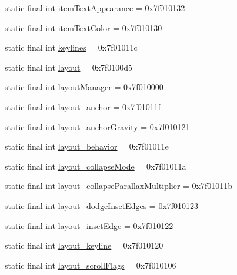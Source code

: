\begin{CompactItemize}
\item 
static final int \hyperlink{classandroid_1_1support_1_1transition_1_1_r_1_1attr_502aeef98fd65a8774129bb15aebb722}{itemTextAppearance} = 0x7f010132
\item 
static final int \hyperlink{classandroid_1_1support_1_1transition_1_1_r_1_1attr_2be6a5b1db7aac1be85b61a0a81d6a21}{itemTextColor} = 0x7f010130
\item 
static final int \hyperlink{classandroid_1_1support_1_1transition_1_1_r_1_1attr_3b26d81a9d1e46f3df549134e8cafca7}{keylines} = 0x7f01011c
\item 
static final int \hyperlink{classandroid_1_1support_1_1transition_1_1_r_1_1attr_5b38b08230f0458ed53a4c21a3efcdec}{layout} = 0x7f0100d5
\item 
static final int \hyperlink{classandroid_1_1support_1_1transition_1_1_r_1_1attr_d87d38e1dce19d5b501e04e8121d3af8}{layoutManager} = 0x7f010000
\item 
static final int \hyperlink{classandroid_1_1support_1_1transition_1_1_r_1_1attr_9c3a6b35debd5592af5a68d2a1174a74}{layout\_\-anchor} = 0x7f01011f
\item 
static final int \hyperlink{classandroid_1_1support_1_1transition_1_1_r_1_1attr_deb09abe8bca82a431b8d725efdf2e2a}{layout\_\-anchorGravity} = 0x7f010121
\item 
static final int \hyperlink{classandroid_1_1support_1_1transition_1_1_r_1_1attr_a85bbd8c93bb3382b61fbe9da5c62bf4}{layout\_\-behavior} = 0x7f01011e
\item 
static final int \hyperlink{classandroid_1_1support_1_1transition_1_1_r_1_1attr_8b372f8040437629c55539946818fe65}{layout\_\-collapseMode} = 0x7f01011a
\item 
static final int \hyperlink{classandroid_1_1support_1_1transition_1_1_r_1_1attr_1067c52fc6316304f5d4bd5996da38d9}{layout\_\-collapseParallaxMultiplier} = 0x7f01011b
\item 
static final int \hyperlink{classandroid_1_1support_1_1transition_1_1_r_1_1attr_07df3ebbb6c9e2ca661734d77504e44d}{layout\_\-dodgeInsetEdges} = 0x7f010123
\item 
static final int \hyperlink{classandroid_1_1support_1_1transition_1_1_r_1_1attr_568f00a8730782a703351dec5c12ccb5}{layout\_\-insetEdge} = 0x7f010122
\item 
static final int \hyperlink{classandroid_1_1support_1_1transition_1_1_r_1_1attr_96d91081a86d6ce37a0299619ec50dce}{layout\_\-keyline} = 0x7f010120
\item 
static final int \hyperlink{classandroid_1_1support_1_1transition_1_1_r_1_1attr_f76067fdd760ff68167015055feb3c93}{layout\_\-scrollFlags} = 0x7f010106

\end{CompactItemize}
